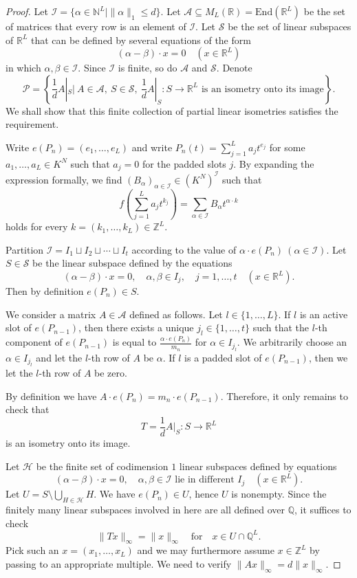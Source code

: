 \documentclass[10pt,a4paper]{amsart}
\begin{document}
\begin{proof}
Let $\mathcal{I}=\{\alpha\in\mathbb{N}^L\mid\|\alpha\|_1\leq d\}$. Let $\mathcal{A}\subseteq M_L(\mathbb{R})=\mathrm{End}(\mathbb{R}^L)$ be the set of matrices that every row is an element of $\mathcal{I}$. Let $\mathcal{S}$ be the set of linear subspaces of $\mathbb{R}^L$ that can be defined by several equations of the form
$$
(\alpha-\beta)\cdot x=0\quad(x\in\mathbb{R}^L)
$$
in which $\alpha,\beta\in\mathcal{I}$. Since $\mathcal{I}$ is finite, so do $\mathcal{A}$ and $\mathcal{S}$. Denote
$$
\mathcal{P}=\left\{\frac{1}{d}A|_{S}\bigg|\ A\in\mathcal{A},\ S\in\mathcal{S},\ \frac{1}{d}A|_{S}\colon S\to\mathbb{R}^L\text{ is an isometry onto its image}\right\}.
$$
We shall show that this finite collection of partial linear isometries satisfies the requirement.

Write $e(P_n)=(e_1,\dots,e_L)$ and write $P_n(t)=\sum\limits_{j=1}^L a_jt^{e_j}$ for some $a_1,\dots,a_L\in K^N$ such that $a_j=0$ for the padded slots $j$. By expanding the expression formally, we find $(B_{\alpha})_{\alpha\in\mathcal{I}}\in(K^N)^{\mathcal{I}}$ such that
$$
f\left(\sum\limits_{j=1}^L a_jt^{k_j}\right)=\sum\limits_{\alpha\in\mathcal{I}}B_{\alpha}t^{\alpha\cdot k}
$$
holds for every $k=(k_1,\dots,k_L)\in\mathbb{Z}^L$.

Partition $\mathcal{I}=I_1\sqcup I_2\sqcup\cdots\sqcup I_t$ according to the value of $\alpha\cdot e(P_n)\ (\alpha\in\mathcal{I})$. Let $S\in\mathcal{S}$ be the linear subspace defined by the equations
$$
(\alpha-\beta)\cdot x=0,\quad\alpha,\beta\in I_j,\quad j=1,\dots,t\quad(x\in\mathbb{R}^L).
$$
Then by definition $e(P_n)\in S$.

We consider a matrix $A\in\mathcal{A}$ defined as follows. Let $l\in\{1,\dots,L\}$. If $l$ is an active slot of $e(P_{n-1})$, then there exists a unique $j_l\in\{1,\dots,t\}$ such that the $l$-th component of $e(P_{n-1})$ is equal to $\frac{\alpha\cdot e(P_n)}{m_n}$ for $\alpha\in I_{j_l}$. We arbitrarily choose an $\alpha\in I_{j_l}$ and let the $l$-th row of $A$ be $\alpha$. If $l$ is a padded slot of $e(P_{n-1})$, then we let the $l$-th row of $A$ be zero.

By definition we have $A\cdot e(P_n)=m_n\cdot e(P_{n-1})$. Therefore, it only remains to check that
$$
T=\frac{1}{d}A|_{S}\colon S\to\mathbb{R}^L
$$
is an isometry onto its image.

Let $\mathcal{H}$ be the finite set of codimension $1$ linear subspaces defined by equations
$$
(\alpha-\beta)\cdot x=0,\quad\alpha,\beta\in\mathcal{I}\text{ lie in different }I_j\quad(x\in\mathbb{R}^L).
$$
Let $U=S\setminus\bigcup\limits_{H\in\mathcal{H}}H$. We have $e(P_n)\in U$, hence $U$ is nonempty. Since the finitely many linear subspaces involved in here are all defined over $\mathbb{Q}$, it suffices to check
$$
\|Tx\|_{\infty}=\|x\|_{\infty}\quad\text{for}\quad x\in U\cap\mathbb{Q}^L.
$$
Pick such an $x=(x_1,\dots,x_L)$ and we may furthermore assume $x\in\mathbb{Z}^L$ by passing to an appropriate multiple. We need to verify $\|Ax\|_{\infty}=d\|x\|_{\infty}$.


\end{proof}
\end{document}

